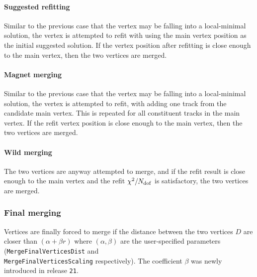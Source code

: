 \paragraph{Suggested refitting}
Similar to the previous case that the vertex may be falling into a local-minimal solution, the vertex is attempted to refit with using the main vertex position as the initial suggested solution. If the vertex position after refitting is close enough to the main vertex, then the two vertices are merged.

\paragraph{Magnet merging}
Similar to the previous case that the vertex may be falling into a local-minimal solution, the vertex is attempted to refit, with adding one track from the candidate main vertex. This is repeated for all constituent tracks in the main vertex. If the refit vertex position is close enough to the main vertex, then the two vertices are merged.

\paragraph{Wild merging}
The two vertices are anyway attempted to merge, and if the refit result is close enough to the main vertex and the refit $\chi^{2}/N_{\rm dof}$ is satisfactory, the two vertices are merged.



\subsubsection{Final merging}
Vertices are finally forced to merge if the distance between the two vertices $D$ are closer than $(\alpha + \beta r)$ where $(\alpha,\beta)$ are the user-specified parameters ({\tt MergeFinalVerticesDist} and \\{\tt MergeFinalVerticesScaling} respectively). The coefficient $\beta$ was newly introduced in release {\tt 21}.


